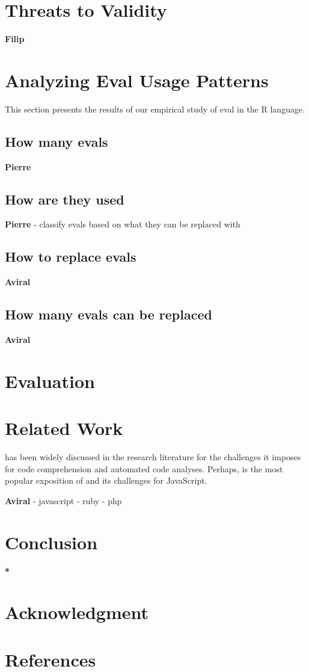 \documentclass[conference]{IEEEtran}
\begin{document}
\section{Threats to Validity}
\textbf{Filip}

\section{Analyzing Eval Usage Patterns}
This section presents the results of our empirical study of eval in the R language.
\subsection{How many evals}
\textbf{Pierre}

\subsection{How are they used}
\textbf{Pierre}
- classify evals based on what they can be replaced with

\subsection{How to replace evals}
\textbf{Aviral}

\subsection{How many evals can be replaced}
\textbf{Aviral}

\section{Evaluation}

\section{Related Work}
\eval has been widely discussed in the research literature for the challenges it
imposes for code comprehension and automated code analyses.
Perhaps,  is the most popular exposition of \eval and its
challenges for JavaScript. 

\textbf{Aviral}
- javascript
- ruby
- php

\section{Conclusion}
\textbf{*}


\section*{Acknowledgment}

\section*{References}
\end{document}
